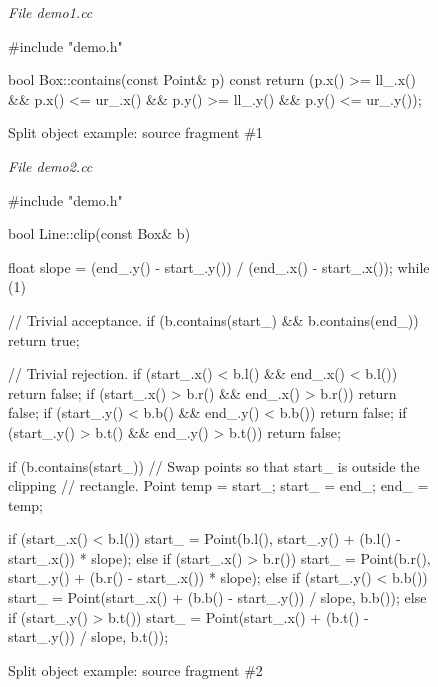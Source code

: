 \vspace{2cm}
\begin{figure}[ht]
\textit{File demo1.cc}
\begin{nlnlisting}
#include "demo.h"

bool Box::contains(const Point& p) const
{
    return (p.x() >= ll_.x() && p.x() <= ur_.x() &&
            p.y() >= ll_.y() && p.y() <= ur_.y());
}
\end{nlnlisting}
\caption{Split object example: source fragment \#1}
\label{fig:splitobjectexamplesourcefragment1}
\end{figure}

\begin{figure}[ht]
\textit{File demo2.cc}
\begin{nlnlisting}
#include "demo.h"

bool Line::clip(const Box& b)
{
  float slope = (end_.y() - start_.y()) / (end_.x() - start_.x());
  while (1) {
    // Trivial acceptance.
    if (b.contains(start_) && b.contains(end_)) return true;

    // Trivial rejection.
    if (start_.x() < b.l() && end_.x() < b.l()) return false;
    if (start_.x() > b.r() && end_.x() > b.r()) return false;
    if (start_.y() < b.b() && end_.y() < b.b()) return false;
    if (start_.y() > b.t() && end_.y() > b.t()) return false;

    if (b.contains(start_)) {
      // Swap points so that start_ is outside the clipping 
      // rectangle.
      Point temp = start_;
      start_ = end_;
      end_ = temp;
    }

    if (start_.x() < b.l())
      start_ = Point(b.l(), 
                     start_.y() + (b.l() - start_.x()) * slope);
    else if (start_.x() > b.r())
      start_ = Point(b.r(), 
                     start_.y() + (b.r() - start_.x()) * slope);
    else if (start_.y() < b.b())
      start_ = Point(start_.x() + (b.b() - start_.y()) / slope, 
                     b.b());
    else if (start_.y() > b.t())
      start_ = Point(start_.x() + (b.t() - start_.y()) / slope, 
                     b.t());
  }
}
\end{nlnlisting}
\caption{Split object example: source fragment \#2}
\label{fig:splitobjectexamplesourcefragment2}
\end{figure}

